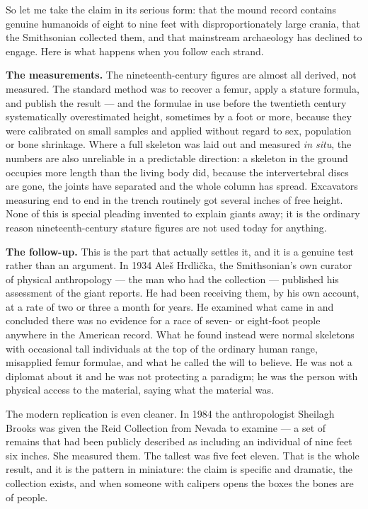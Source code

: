 So let me take the claim in its serious form: that the mound record contains genuine
humanoids of eight to nine feet with disproportionately large crania, that the Smithsonian
collected them, and that mainstream archaeology has declined to engage. Here is what happens
when you follow each strand.

\textbf{The measurements.} The nineteenth-century figures are almost all derived, not measured.
The standard method was to recover a femur, apply a stature formula, and publish the result ---
and the formulae in use before the twentieth century systematically overestimated height,
sometimes by a foot or more, because they were calibrated on small samples and applied without
regard to sex, population or bone shrinkage. Where a full skeleton was laid out and measured
\emph{in situ}, the numbers are also unreliable in a predictable direction: a skeleton in the
ground occupies more length than the living body did, because the intervertebral discs are gone,
the joints have separated and the whole column has spread. Excavators measuring end to end in
the trench routinely got several inches of free height. None of this is special pleading
invented to explain giants away; it is the ordinary reason nineteenth-century stature figures
are not used today for anything.

\textbf{The follow-up.} This is the part that actually settles it, and it is a genuine test
rather than an argument. In 1934 Ale\v{s} Hrdli\v{c}ka, the Smithsonian's own curator of physical
anthropology --- the man who had the collection --- published his assessment of the giant
reports. He had been receiving them, by his own account, at a rate of two or three a month for
years. He examined what came in and concluded there was no evidence for a race of seven- or
eight-foot people anywhere in the American record. What he found instead were normal skeletons
with occasional tall individuals at the top of the ordinary human range, misapplied femur
formulae, and what he called the will to believe. He was not a diplomat about it and he was not
protecting a paradigm; he was the person with physical access to the material, saying what the
material was.

The modern replication is even cleaner. In 1984 the anthropologist Sheilagh Brooks was given
the Reid Collection from Nevada to examine --- a set of remains that had been publicly described
as including an individual of nine feet six inches. She measured them. The tallest was five
feet eleven. That is the whole result, and it is the pattern in miniature: the claim is
specific and dramatic, the collection exists, and when someone with calipers opens the boxes
the bones are of people.

